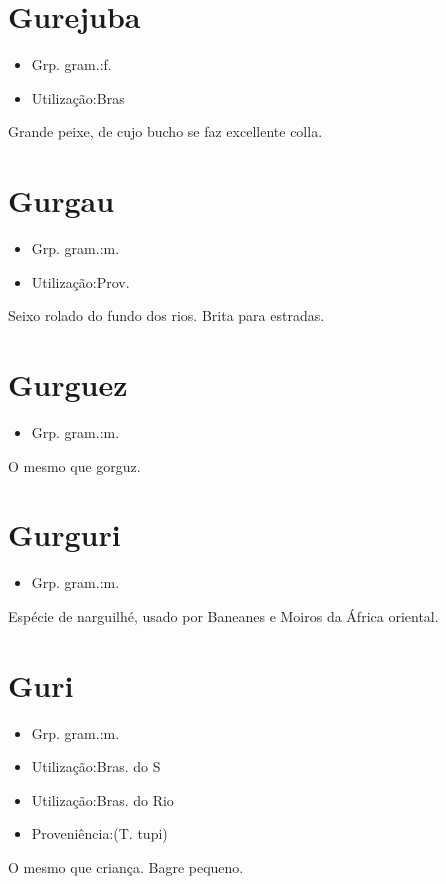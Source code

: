 \section{Gurejuba}
\begin{itemize}
\item {Grp. gram.:f.}
\end{itemize}
\begin{itemize}
\item {Utilização:Bras}
\end{itemize}
Grande peixe, de cujo bucho se faz excellente colla.
\section{Gurgau}
\begin{itemize}
\item {Grp. gram.:m.}
\end{itemize}
\begin{itemize}
\item {Utilização:Prov.}
\end{itemize}
Seixo rolado do fundo dos rios.
Brita para estradas.
\section{Gurguez}
\begin{itemize}
\item {Grp. gram.:m.}
\end{itemize}
O mesmo que \textunderscore gorguz\textunderscore .
\section{Gurguri}
\begin{itemize}
\item {Grp. gram.:m.}
\end{itemize}
Espécie de narguilhé, usado por Baneanes e Moiros da África oriental.
\section{Guri}
\begin{itemize}
\item {Grp. gram.:m.}
\end{itemize}
\begin{itemize}
\item {Utilização:Bras. do S}
\end{itemize}
\begin{itemize}
\item {Utilização:Bras. do Rio}
\end{itemize}
\begin{itemize}
\item {Proveniência:(T. tupi)}
\end{itemize}
O mesmo que \textunderscore criança\textunderscore .
Bagre pequeno.
